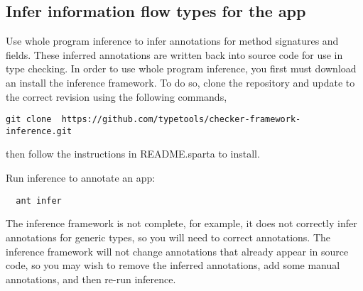 %
%
%
%
%
%
%
%

\subsection{Infer information flow types for the app\label{flow-task-annotate-app}}
Use whole program inference to infer annotations for method signatures and fields.  
These inferred 
annotations are written back into source code for use in type checking.  In order to use whole program
inference, you first must download an install the inference framework.  To do so, clone the repository 
and update to the correct revision using the following commands,
\begin{Verbatim}
git clone  https://github.com/typetools/checker-framework-inference.git
\end{Verbatim}
\noindent
then follow the instructions in README.sparta to install.

Run inference to annotate an app:

\begin{Verbatim}
  ant infer
\end{Verbatim}

The inference framework is not complete, for example, it does not correctly infer annotations 
for generic types, so you will need to correct annotations.  The inference framework will
not change annotations that already appear in source code, so you may wish to remove the inferred 
annotations, add some manual annotations, and then re-run inference. 

